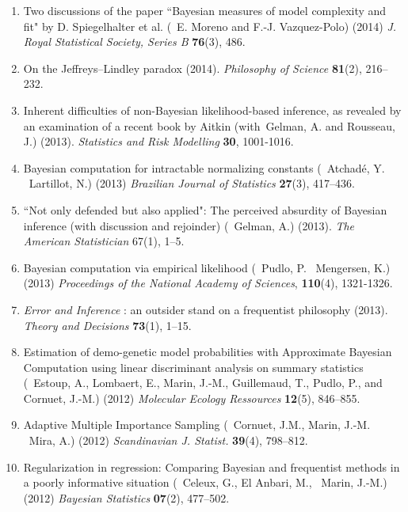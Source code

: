 \begin{enumerate}
\item Two discussions of the paper ``Bayesian measures of model complexity
and fit" by D. Spiegelhalter et al. (\avec~E. Moreno and F.-J. Vazquez-Polo) (2014)
{\em J. Royal Statistical Society, Series B} {\bf 76}(3), 486.

\item On the Jeffreys--Lindley paradox (2014). \emph{Philosophy of Science} \textbf{81}(2), 216--232.

\item Inherent difficulties of non-Bayesian likelihood-based inference, as 
revealed by an examination of a recent book by Aitkin (with~Gelman, A. and
Rousseau, J.) (2013). \emph{Statistics and Risk Modelling} \textbf{30}, 1001-1016.

\item Bayesian computation for intractable normalizing constants
(\avec~Atchad\'e, Y. \et~Lartillot, N.) (2013) {\em Brazilian Journal of Statistics} \textbf{27}(3), 417--436.

\item ``Not only defended but also applied": The perceived absurdity of Bayesian inference 
(with discussion and rejoinder) (\avec~Gelman, A.) (2013). {\em The American Statistician} 
67(1), 1--5.

\item Bayesian computation via empirical likelihood (\avec~Pudlo, P. \et~Mengersen, K.) (2013) {\em 
Proceedings of the National Academy of Sciences}, {\bf 110}(4), 1321-1326.

\item {\em Error and Inference} : an outsider stand on a frequentist philosophy (2013). 
{\em Theory and Decisions} {\bf 73}(1), 1--15.

\item Estimation of demo-genetic model probabilities with Approximate Bayesian Computation using 
linear discriminant analysis on summary statistics (\avec~Estoup, A., Lombaert, E., Marin, J.-M., 
Guillemaud, T., Pudlo, P., and Cornuet, J.-M.) (2012) {\em Molecular Ecology Ressources} 
{\bf 12}(5), 846--855.

\item Adaptive Multiple Importance Sampling (\avec~Cornuet, J.M., Marin, J.-M. \et~Mira, A.) (2012)
{\em Scandinavian J. Statist.} {\bf 39}(4), 798--812.

\item Regularization in regression: Comparing Bayesian and frequentist methods in a poorly informative situation
(\avec~Celeux, G., El Anbari, M., \et~Marin, J.-M.) (2012) {\em Bayesian Statistics} {\bf 07}(2), 477--502.


\end{enumerate}
